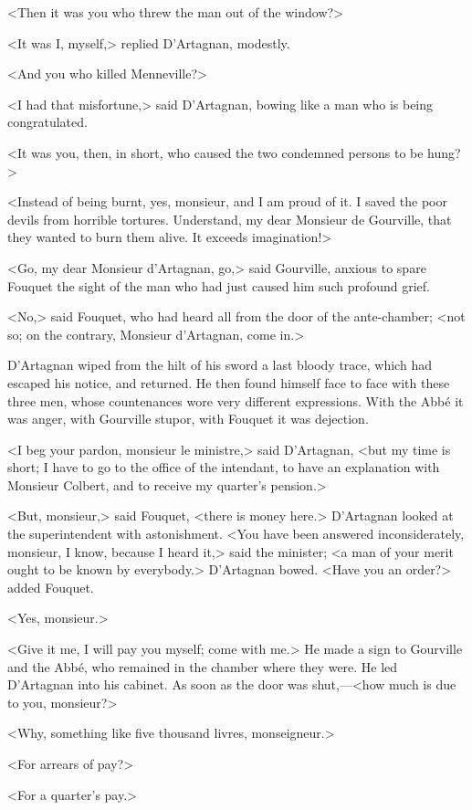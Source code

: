 <Then it was you who threw the man out of the window?>

<It was I, myself,> replied D'Artagnan, modestly.

<And you who killed Menneville?>

<I had that misfortune,> said D'Artagnan, bowing like a man who is being congratulated.

<It was you, then, in short, who caused the two condemned persons to be hung?>

<Instead of being burnt, yes, monsieur, and I am proud of it. I saved the poor devils from horrible tortures. Understand, my dear Monsieur de Gourville, that they wanted to burn them alive. It exceeds imagination!>

<Go, my dear Monsieur d'Artagnan, go,> said Gourville, anxious to spare Fouquet the sight of the man who had just caused him such profound grief.

<No,> said Fouquet, who had heard all from the door of the ante-chamber; <not so; on the contrary, Monsieur d'Artagnan, come in.>

D'Artagnan wiped from the hilt of his sword a last bloody trace, which had escaped his notice, and returned. He then found himself face to face with these three men, whose countenances wore very different expressions. With the Abbé it was anger, with Gourville stupor, with Fouquet it was dejection.

<I beg your pardon, monsieur le ministre,> said D'Artagnan, <but my time is short; I have to go to the office of the intendant, to have an explanation with Monsieur Colbert, and to receive my quarter's pension.>

<But, monsieur,> said Fouquet, <there is money here.> D'Artagnan looked at the superintendent with astonishment. <You have been answered inconsiderately, monsieur, I know, because I heard it,> said the minister; <a man of your merit ought to be known by everybody.> D'Artagnan bowed. <Have you an order?> added Fouquet.

<Yes, monsieur.>

<Give it me, I will pay you myself; come with me.> He made a sign to Gourville and the Abbé, who remained in the chamber where they were. He led D'Artagnan into his cabinet. As soon as the door was shut,—<how much is due to you, monsieur?>

<Why, something like five thousand livres, monseigneur.>

<For arrears of pay?>

<For a quarter's pay.>

